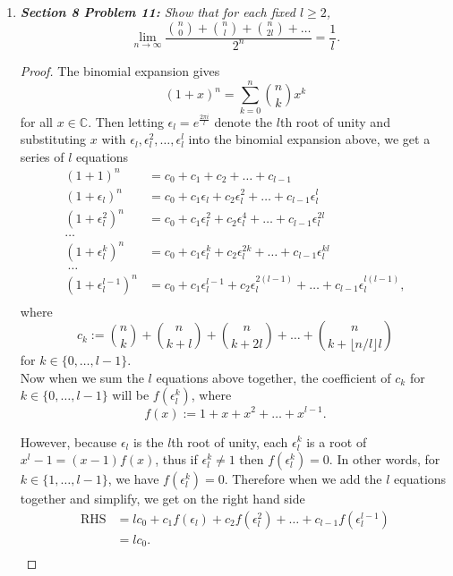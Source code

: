 \documentclass{article}
\begin{document}
\begin{enumerate}[label={\bf Q\arabic*:}]
  \item \it \textbf{Section 8 Problem 11:} Show that for each fixed
    $l\geq2$,
    \[\lim_{n\rightarrow\infty}
    \frac{\binom{n}{0}+\binom{n}{l}+\binom{n}{2l}+\ldots}{2^n}
    =\frac{1}{l}.\]

    \begin{proof}
      The binomial expansion gives
      \[(1+x)^n =\sum_{k=0}^n\binom{n}{k}x^k\]
      for all $x\in\mathbb{C}$. Then letting $\epsilon_l=e^{\frac{2\pi
      i}{l}}$ denote the $l$th root of unity and substituting $x$ with
      $\epsilon_l,\epsilon_l^2,\ldots,\epsilon_l^l$ into the binomial
      expansion above, we get a series of $l$ equations
      \begin{align*}
        (1+1)^n           &=c_0+c_1+c_2+\ldots+c_{l-1}\\
        (1+\epsilon_l)^n   &=c_0+c_1\epsilon_l  +c_2\epsilon_l^2
          +\ldots+c_{l-1}\epsilon_l^l\\
        (1+\epsilon_l^2)^n &=c_0+c_1\epsilon_l^2+c_2\epsilon_l^4
          +\ldots+c_{l-1}\epsilon_l^{2l}\\
        \ldots\\
        (1+\epsilon_l^k)^n &=c_0+c_1\epsilon_l^k+c_2\epsilon_l^{2k}
          +\ldots+c_{l-1}\epsilon_l^{kl}\\\
        \ldots\\
        (1+\epsilon_l^{l-1})^n
          &=c_0+c_1\epsilon_l^{l-1}+c_2\epsilon_l^{2(l-1)}
          +\ldots+c_{l-1}\epsilon_l^{l(l-1)},\\
      \end{align*}
      where
      \[c_k :=\binom{n}{k}+\binom{n}{k+l}+\binom{n}{k+2l}+
      \ldots+\binom{n}{k+\lfloor n/l\rfloor l}\]
      for $k\in\{0,\ldots,l-1\}$. \\

      Now when we sum the $l$ equations above together, the coefficient of
      $c_k$ for $k\in\{0,\ldots,l-1\}$ will be $f(\epsilon_l^k)$, where
      \[f(x):=1+x+x^2+\ldots+x^{l-1}.\]

      However, because $\epsilon_l$ is the $l$th root of unity,
      each $\epsilon_l^k$ is a root of $x^l-1=(x-1)f(x)$, thus if
      $\epsilon_l^k\neq1$ then $f(\epsilon_l^k)=0$. In other words, for
      $k\in\{1,\ldots,l-1\}$, we have $f(\epsilon_l^k)=0$. Therefore when
      we add the $l$ equations together and simplify, we get on the
      right hand side
      \begin{align*}
        \text{RHS} &=lc_0 +c_1f(\epsilon_l) +c_2f(\epsilon_l^2) +\ldots
          +c_{l-1}f(\epsilon_l^{l-1})\\
        &=lc_0.\\
      \end{align*}


\end{proof}
\end{enumerate}
\end{document}
